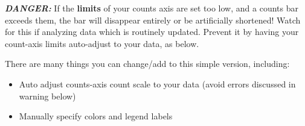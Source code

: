 \documentclass[
]{article}
\providecommand{\tightlist}{%
  \setlength{\itemsep}{0pt}\setlength{\parskip}{0pt}}
\begin{document}
{\textbf{\emph{DANGER:}} If the \textbf{limits} of your counts axis are
set too low, and a counts bar exceeds them, the bar will disappear
entirely or be artificially shortened! Watch for this if analyzing data
which is routinely updated. Prevent it by having your count-axis limits
auto-adjust to your data, as below.}

There are many things you can change/add to this simple version,
including:

\begin{itemize}
\tightlist
\item
  Auto adjust counts-axis count scale to your data (avoid errors
  discussed in warning below)\\
\item
  Manually specify colors and legend labels
\end{itemize}
\end{document}
